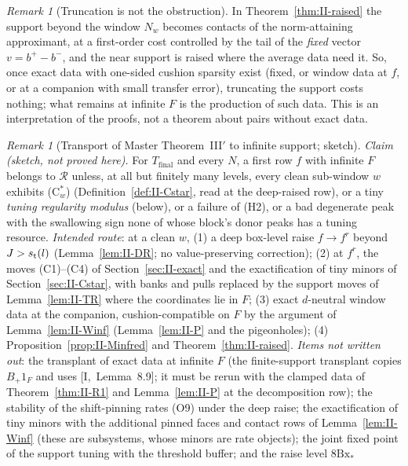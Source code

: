 \documentclass[10pt]{amsart}
\theoremstyle{definition}
\theoremstyle{remark}
\newtheorem{remark}[theorem]{Remark}
\newcommand{\Rec}{\mathcal R}
\begin{document}
\begin{remark}[Truncation is not the obstruction]\label{rem:II-trunc}
In Theorem~\ref{thm:II-raised} the support beyond the window $N_w$ becomes
contacts of the norm-attaining approximant, at a first-order cost controlled
by the tail of the \emph{fixed} vector $v=b^+-b^-$, and the near support is
raised where the average data need it.  So, once exact data with one-sided
cushion sparsity exist (fixed, or window data at $f$, or at a companion with
small transfer error), truncating the support costs nothing; what remains at
infinite $F$ is the production of such data.  This is an interpretation of
the proofs, not a theorem about pairs without exact data.
\end{remark}

\begin{remark}[Transport of Master Theorem~III$'$ to infinite support;
sketch]\label{rem:II-Minf}
\emph{Claim (sketch, not proved here).}  For $T_{\mathrm{final}}$ and every
$N$, a first row $f$ with infinite $F$ belongs to $\Rec$ unless, at all but
finitely many levels, every clean sub-window $w$ exhibits (C$^*_w$)
(Definition~\ref{def:II-Cstar}, read at the deep-raised row), or a tiny
\emph{tuning regularity modulus} (below), or a failure of (H2), or a bad
degenerate peak with the swallowing sign none of whose block's donor peaks
has a tuning resource.  \emph{Intended route}: at a clean $w$, (1) a deep
box-level raise $f\to f^r$ beyond $J>s_{\rm t}(l)$ (Lemma~\ref{lem:II-DR}; no
value-preserving correction); (2) at $f^r$, the moves (C1)--(C4) of
Section~\ref{sec:II-exact} and the exactification of tiny minors of
Section~\ref{sec:II-Cstar}, with banks and pulls replaced by the support moves
of Lemma~\ref{lem:II-TR} where the coordinates lie in $F$; (3) exact
$d$-neutral window data at the companion, cushion-compatible on $F$ by the
argument of Lemma~\ref{lem:II-Winf} (Lemma~\ref{lem:II-P} and the pigeonholes);
(4) Proposition~\ref{prop:II-Minfred} and Theorem~\ref{thm:II-raised}.
\emph{Items not written out}: the transplant of exact data at infinite $F$
(the finite-support transplant copies $B_+1_F$ and uses [I,~Lemma~8.9]; it must
be rerun with the clamped data of Theorem~\ref{thm:II-R1} and
Lemma~\ref{lem:II-P} at the decomposition row); the stability of the shift-pinning
rates (O9) under the deep raise; the exactification of tiny minors with the
additional pinned faces and contact rows of Lemma~\ref{lem:II-Winf} (these are
subsystems, whose minors are rate objects); the joint fixed point of the
support tuning with the threshold buffer; and the raise level $8\mathrm{Bx}_*$

\end{remark}
\end{document}
